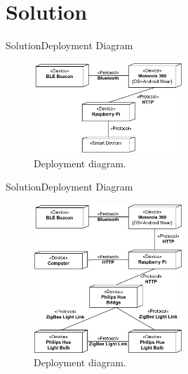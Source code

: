 \section{Solution}
\begin{frame}{Solution}{Deployment Diagram}
\begin{figure}[h]
\centering
\includegraphics[width=0.5\textwidth]{../images/deployment-diagram-basic}
\caption{Deployment diagram.}
\end{figure}
\end{frame}

\begin{frame}{Solution}{Deployment Diagram}
\begin{figure}[h]
\centering
\includegraphics[width=0.5\textwidth]{../images/deployment-diagram-simple}
\caption{Deployment diagram.}
\end{figure}
\end{frame}

